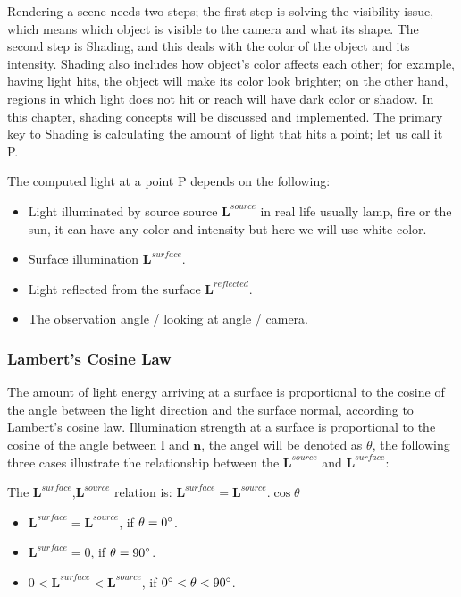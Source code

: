 \documentclass{article}
\begin{document}
	Rendering a scene needs two steps; the first step is solving the visibility issue, which means which object is visible to the camera and what its shape. The second step is Shading, and this deals with the color of the object and its intensity. Shading also includes how object's color affects each other; for example, having light hits, the object will make its color look brighter; on the other hand, regions in which light does not hit or reach will have dark color or shadow. In this chapter, shading concepts will be discussed and implemented.  The primary key to Shading is calculating the amount of light that hits a point; let us call it P. 
	
	The computed light at a point P depends on the following: 
	
	\begin{itemize}
		\item Light illuminated by source source  $\pmb{L}^{source}$  in real life usually lamp, fire or the sun, it can have any color and intensity but here we will use white color. 
		\item Surface illumination $\pmb{L}^{surface}$.
		\item Light reflected from the surface $\pmb{L}^{reflected}$.
		\item The observation angle / looking at angle / camera. 
	\end{itemize}
	
	
	
	
	\subsubsection{Lambert's Cosine Law}
	The amount of light energy arriving at a surface is proportional to the cosine of the angle between the light direction and the surface normal, according to Lambert's cosine law. Illumination strength at a surface is proportional to the cosine of the angle between $\pmb{l}$ and $\pmb{n}$, the angel will be denoted as $\theta$, the following three cases illustrate the relationship between the  $\pmb{L}^{source}$ and  $\pmb{L}^{surface}$:
	
	The  $\pmb{L}^{surface}$,$ \pmb{L}^{source}$ relation is: $\pmb{L}^{surface} = \pmb{L}^{source}.\cos \theta $
	\begin{itemize}
		\item $\pmb{L}^{surface} = \pmb{L}^{source}$, if $\theta = 0\degree$.
		\item $\pmb{L}^{surface} = 0$, if $\theta = 90\degree$.
		\item $0 < \pmb{L}^{surface} < \pmb{L}^{source}$, if $0\degree < \theta  < 90\degree$.
	\end{itemize}
	
\end{document}
